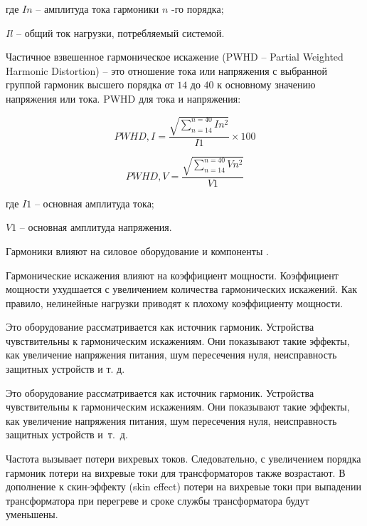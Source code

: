 где $In$ – амплитуда тока гармоники $n$ -го порядка;

$Il$ – общий ток нагрузки, потребляемый системой.

Частичное взвешенное гармоническое искажение (PWHD – Partial Weighted Harmonic Distortion) -- это отношение тока или напряжения с выбранной группой гармоник высшего порядка от $14$ до $40$ к основному значению напряжения или тока. PWHD для тока и напряжения:

\begin{equation}
	\label{eq:equation1.17}
PWHD,I = \frac{\sqrt{\displaystyle\sum_{n=14}^{n=40} In^2}}{I1} \times 100 
\end{equation} 

\begin{equation}
	\label{eq:equation1.18}
	PWHD,V = \frac{\sqrt{\displaystyle\sum_{n=14}^{n=40} Vn^2}}{V1} 
\end{equation} 

где $I1$ – основная амплитуда тока;

$V1$ – основная амплитуда напряжения.

Гармоники влияют на силовое оборудование и компоненты \cite{soni2014review, kamenka2014six}.


Гармонические искажения влияют на коэффициент мощности. Коэффициент мощности ухудшается с увеличением количества гармонических искажений. Как правило, нелинейные нагрузки приводят к плохому коэффициенту мощности.

Это оборудование рассматривается как источник гармоник. Устройства чувствительны к гармоническим искажениям. Они показывают такие эффекты, как увеличение напряжения питания, шум пересечения нуля, неисправность защитных устройств и т. д.

Это оборудование рассматривается как источник гармоник. Устройства чувствительны к гармоническим искажениям. Они показывают такие эффекты, как увеличение напряжения питания, шум пересечения нуля, неисправность защитных устройств и~т.~д.

Частота вызывает потери вихревых токов. Следовательно, с увеличением порядка гармоник потери на вихревые токи для трансформаторов также возрастают. В дополнение к скин-эффекту (skin effect) потери на вихревые токи при выпадении трансформатора при перегреве и сроке службы трансформатора будут уменьшены.

